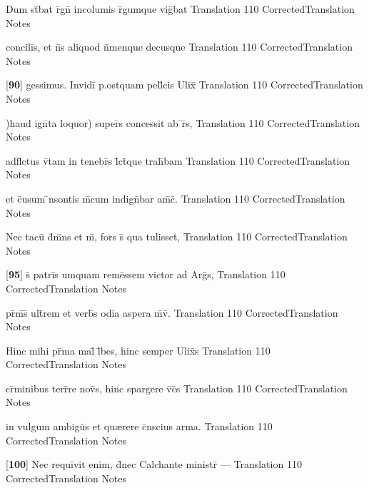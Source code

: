 \latline
  {Dum st\={}bat r\={}gn\={} incolumis r\={}gumque vig\={}bat}
  { Translation }
  {110}
  { CorrectedTranslation }
  { Notes }


\latline
  {concili\={\macron {\i}}s, et n\={}s aliquod n\={}menque decusque}
  { Translation }
  {110}
  { CorrectedTranslation }
  { Notes }


\latline
  {[\textbf{90}] gessimus.  Invidi\={} p.ostquam pell\={}cis Ulix\={\macron {\i}}}
  { Translation }
  {110}
  { CorrectedTranslation }
  { Notes }


\latline
  {)haud ign\={}ta loquor) super\={\macron {\i}}s concessit ab \={}r\={\macron {\i}}s,}
  { Translation }
  {110}
  { CorrectedTranslation }
  { Notes }


\latline
  {adfl\={\macron {\i}}ctus v\={\macron {\i}}tam in tenebr\={\macron {\i}}s l\={}ct\={}que trah\={}bam}
  { Translation }
  {110}
  { CorrectedTranslation }
  { Notes }


\latline
  {et c\={}usum \={\macron {\i}}nsontis m\={}cum indign\={}bar am\={\macron {\i}}c\={\macron {\i}}.}
  { Translation }
  {110}
  { CorrectedTranslation }
  { Notes }


\latline
  {Nec tacu\={\macron {\i}} d\={}m\={}ns et m\={}, fors s\={\macron {\i}} qua tulisset,}
  { Translation }
  {110}
  { CorrectedTranslation }
  { Notes }


\latline
  {[\textbf{95}] s\={\macron {\i}} patri\={}s umquam reme\={}ssem victor ad Arg\={}s,}
  { Translation }
  {110}
  { CorrectedTranslation }
  { Notes }


\latline
  {pr\={}m\={\macron {\i}}s\={\macron {\i}} ult\={}rem et verb\={\macron {\i}}s odia aspera m\={}v\={\macron {\i}}.}
  { Translation }
  {110}
  { CorrectedTranslation }
  { Notes }


\latline
  {Hinc mihi pr\={\macron {\i}}ma mal\={\macron {\i}} l\={}bes, hinc semper Ulix\={}s}
  { Translation }
  {110}
  { CorrectedTranslation }
  { Notes }


\latline
  {cr\={\macron {\i}}minibus terr\={}re nov\={\macron {\i}}s, hinc spargere v\={}c\={}s}
  { Translation }
  {110}
  { CorrectedTranslation }
  { Notes }


\latline
  {in vulgum ambigu\={}s et qu{\ae}rere c\={}nscius arma.}
  { Translation }
  {110}
  { CorrectedTranslation }
  { Notes }


\latline
  {[\textbf{100}] Nec requi\={}vit enim, d\={}nec Calchante ministr\={} ---}
  { Translation }
  {110}
  { CorrectedTranslation }
  { Notes }


